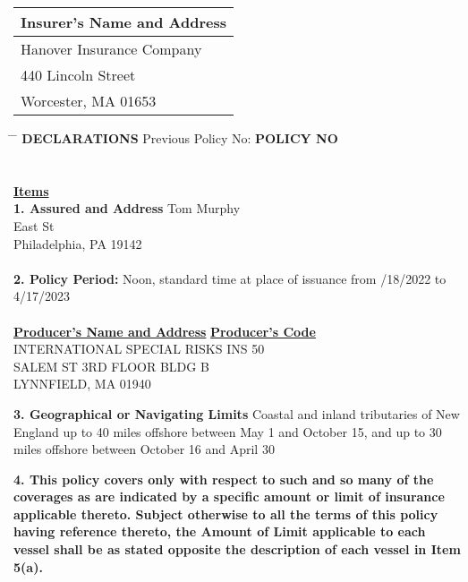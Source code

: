 \documentclass[10pt]{article}
\begin{document}
\extramarks{}{}


\noindent \begin{tabular}{ |C{2.5in}| }
    \hline
    \textbf{Insurer's Name and Address} \\
    \hline
    Hanover Insurance Company \\
    440 Lincoln Street \\
    Worcester, MA 01653 \\
    \hline
\end{tabular}

\begin{tabbing}
    \hspace{3in} \= \hspace{1.75in} \= \kill
    \textbf{DECLARATIONS} \> Previous Policy No: \> \textbf{POLICY NO}\\
    \>   \\
    \\
    \underline{\textbf{Items}} \\
    \textbf{1. Assured and Address} \> \> Tom Murphy \\
    \>  East St \\
    \> \> Philadelphia, PA 19142 \\
    \\
    \textbf{2. Policy Period:} Noon, standard time at place of issuance from \> /18/2022 to 4/17/2023 \\
    \\
    \underline{\textbf{Producer's Name and Address}} \> \underline{\textbf{Producer's Code}} \\
    INTERNATIONAL SPECIAL RISKS INS  50 \\
    SALEM ST 3RD FLOOR BLDG B \\
    LYNNFIELD, MA 01940 \\
\end{tabbing}

\noindent \textbf{3. 	Geographical or Navigating Limits}  Coastal and inland tributaries of New England up to 40 miles offshore between May 1 and October 15, and up to 30 miles offshore between October 16 and April 30
\vspace{\baselineskip}

\noindent \textbf{4.  This policy covers only with respect to such and so many of the coverages as are indicated by a specific amount or limit of insurance applicable thereto.  Subject otherwise to all the terms of this policy having reference thereto, the Amount of Limit applicable to each vessel shall be as stated opposite the description of each vessel in Item 5(a).}
\end{document}
